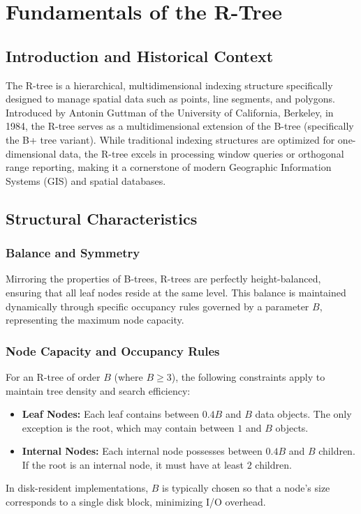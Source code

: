 \documentclass[a4paper, 10pt, titlepage]{report}
\begin{document}
\newpage

\tableofcontents

\chapter{Fundamentals of the R-Tree}

\section{Introduction and Historical Context}
The R-tree is a hierarchical, multidimensional indexing structure specifically designed to manage spatial data such as points, line segments, and polygons. Introduced by Antonin Guttman of the University of California, Berkeley, in 1984, the R-tree serves as a multidimensional extension of the B-tree (specifically the B+ tree variant). While traditional indexing structures are optimized for one-dimensional data, the R-tree excels in processing window queries or orthogonal range reporting, making it a cornerstone of modern Geographic Information Systems (GIS) and spatial databases.

\section{Structural Characteristics}

\subsection{Balance and Symmetry}
Mirroring the properties of B-trees, R-trees are perfectly height-balanced, ensuring that all leaf nodes reside at the same level. This balance is maintained dynamically through specific occupancy rules governed by a parameter $B$, representing the maximum node capacity.

\subsection{Node Capacity and Occupancy Rules}
For an R-tree of order $B$ (where $B \ge 3$), the following constraints apply to maintain tree density and search efficiency:
\begin{itemize}
    \item \textbf{Leaf Nodes:} Each leaf contains between $0.4B$ and $B$ data objects. The only exception is the root, which may contain between $1$ and $B$ objects.
    \item \textbf{Internal Nodes:} Each internal node possesses between $0.4B$ and $B$ children. If the root is an internal node, it must have at least $2$ children.
\end{itemize}
In disk-resident implementations, $B$ is typically chosen so that a node's size corresponds to a single disk block, minimizing I/O overhead.
\end{document}
